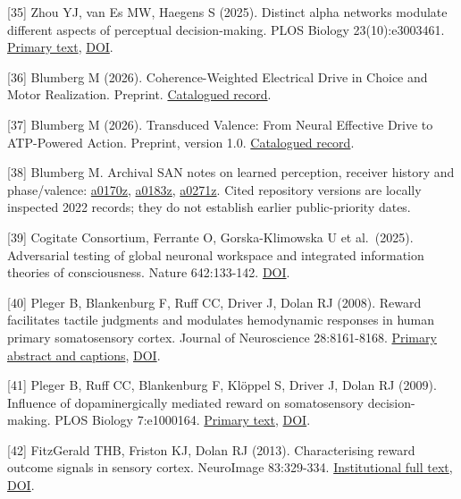 \documentclass[
  american,
  11pt,
  letterpaper,
]{article}
\begin{document}
{[}35{]} Zhou YJ, van Es MW, Haegens S (2025). Distinct alpha networks modulate different aspects of perceptual decision-making. PLOS Biology 23(10):e3003461. \href{https://pmc.ncbi.nlm.nih.gov/articles/PMC12561919/}{Primary text}, \href{https://doi.org/10.1371/journal.pbio.3003461}{DOI}.

{[}36{]} Blumberg M (2026). Coherence-Weighted Electrical Drive in Choice and Motor Realization. Preprint. \href{https://zenodo.org/records/21693966}{Catalogued record}.

{[}37{]} Blumberg M (2026). Transduced Valence: From Neural Effective Drive to ATP-Powered Action. Preprint, version 1.0. \href{https://zenodo.org/records/21857678}{Catalogued record}.

{[}38{]} Blumberg M. Archival SAN notes on learned perception, receiver history and phase/valence: \href{https://github.com/v5ma/selfawarenetworks/blob/0546fa6b18cc5117d145157e1a2ff1c82e0a2de2/a0170z.md}{a0170z}, \href{https://github.com/v5ma/selfawarenetworks/blob/c48b3290909dbb5aeb8dfb8e860c1ca395ead49b/a0183z.md}{a0183z}, \href{https://github.com/v5ma/selfawarenetworks/blob/75b194fb97d2da09fb8bdd4130be98b910a72adb/a0271z.md}{a0271z}. Cited repository versions are locally inspected 2022 records; they do not establish earlier public-priority dates.

{[}39{]} Cogitate Consortium, Ferrante O, Gorska-Klimowska U et al.~(2025). Adversarial testing of global neuronal workspace and integrated information theories of consciousness. Nature 642:133-142. \href{https://doi.org/10.1038/s41586-025-08888-1}{DOI}.

{[}40{]} Pleger B, Blankenburg F, Ruff CC, Driver J, Dolan RJ (2008). Reward facilitates tactile judgments and modulates hemodynamic responses in human primary somatosensory cortex. Journal of Neuroscience 28:8161-8168. \href{https://pubmed.ncbi.nlm.nih.gov/18701678/}{Primary abstract and captions}, \href{https://doi.org/10.1523/JNEUROSCI.1093-08.2008}{DOI}.

{[}41{]} Pleger B, Ruff CC, Blankenburg F, Klöppel S, Driver J, Dolan RJ (2009). Influence of dopaminergically mediated reward on somatosensory decision-making. PLOS Biology 7:e1000164. \href{https://journals.plos.org/plosbiology/article?id=10.1371/journal.pbio.1000164}{Primary text}, \href{https://doi.org/10.1371/journal.pbio.1000164}{DOI}.

{[}42{]} FitzGerald THB, Friston KJ, Dolan RJ (2013). Characterising reward outcome signals in sensory cortex. NeuroImage 83:329-334. \href{https://discovery.ucl.ac.uk/id/eprint/1399507/1/FitzGerald_NeuroImage.pdf}{Institutional full text}, \href{https://doi.org/10.1016/j.neuroimage.2013.06.061}{DOI}.
\end{document}
